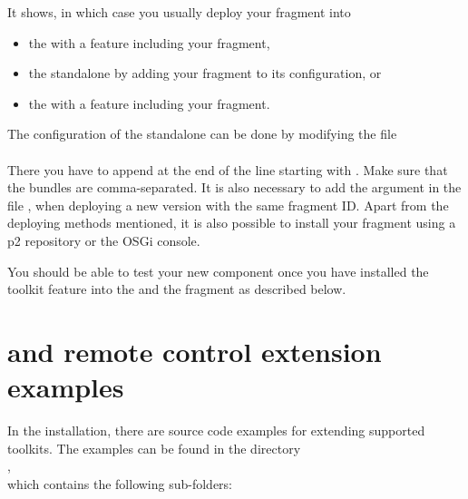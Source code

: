 It shows, in which case you usually deploy your fragment into
\begin{itemize}
  \item the \ite{} with a feature including your fragment,
  \item the standalone \gdagent{} by adding your fragment to its configuration,
        or
  \item the \gdaut{} with a feature including your fragment.
\end{itemize}

The configuration of the standalone \gdagent{} can be done by modifying the
file\\
\\
There you have to append  at the end of the line starting
with . Make sure that the bundles are comma-separated.
It is also necessary to add the argument  in the file
, when deploying a new version with the same
fragment ID. Apart from the deploying methods mentioned, it is also possible to
install your fragment using a p2 repository or the OSGi console.

You should be able to test your new component once you have installed the
toolkit feature into the \ite{} and the fragment as described below.

\section{\ite{} and remote control extension examples}
\label{extensionExamples}

In the installation, there are source code examples for extending supported toolkits. The
examples can be found in the directory\\
,\\
which contains the following sub-folders:

